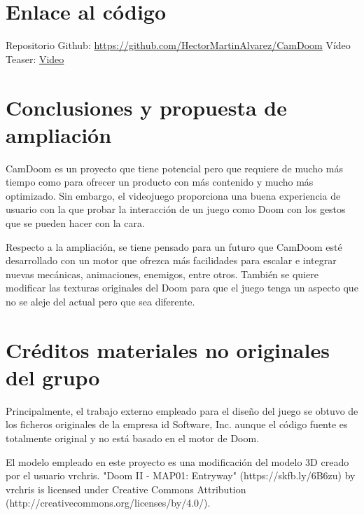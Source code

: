 \documentclass{article}
\begin{document}
\section{Enlace al código}

Repositorio Github: \url{https://github.com/HectorMartinAlvarez/CamDoom}
\newline Vídeo Teaser: \href{https://alumnosulpgc-my.sharepoint.com/:v:/g/personal/hector_martin111_alu_ulpgc_es/EZYRzogeOU1Fro4FwhqtykoBI2uztoB7QFM59QOWzkhEog?e=tWAKpz}{Video}

\section{Conclusiones y propuesta de ampliación}

CamDoom es un proyecto que tiene potencial pero que requiere de mucho
más tiempo como para ofrecer un producto con más contenido y mucho más
optimizado. Sin embargo, el videojuego proporciona una buena experiencia
de usuario con la que probar la interacción de un juego como Doom con los
gestos que se pueden hacer con la cara.

Respecto a la ampliación, se tiene pensado para un futuro que CamDoom
esté desarrollado con un motor que ofrezca más facilidades para escalar
e integrar nuevas mecánicas, animaciones, enemigos, entre otros. También
se quiere modificar las texturas originales del Doom para que el juego
tenga un aspecto que no se aleje del actual pero que sea diferente.

\section{Créditos materiales no originales del grupo}

Principalmente, el trabajo externo empleado para el diseño del juego
se obtuvo de los ficheros originales de la empresa id Software, Inc. aunque
el código fuente es totalmente original y no está basado en el motor de Doom.

El modelo empleado en este proyecto es una modificación del modelo 3D creado por el usuario vrchris. \newline "Doom II - MAP01: Entryway" (https://skfb.ly/6B6zu) by vrchris is licensed under Creative Commons Attribution (http://creativecommons.org/licenses/by/4.0/).
\end{document}
